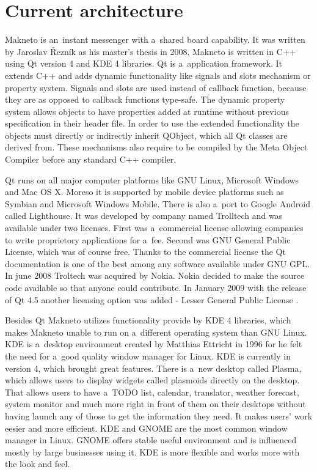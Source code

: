 \section{Current architecture}
Makneto is an~instant messenger with a~shared board capability. It was written by Jaroslav Řezník as his master's thesis in 2008. Makneto is written in C++ using Qt version 4 and KDE 4 libraries. Qt is a~application framework. It extends C++ and adds dynamic functionality like signals and slots mechanism or property system. Signals and slots are used instead of callback function, because they are as opposed to callback functions type-safe. The dynamic property system allows objects to have properties added at runtime without previous specification in their header file. In order to use the extended functionality the objects must directly or indirectly inherit QObject, which all Qt classes are derived from. These mechanisms also require to be compiled by the Meta Object Compiler before any standard C++ compiler.

Qt runs on all major computer platforms like GNU Linux, Microsoft Windows and Mac OS X. Moreso it is supported by mobile device platforms such as Symbian and Microsoft Windows Mobile. There is also a~port to Google Android called Lighthouse. It was developed by company named Trolltech and was available under two licenses. First was a~commercial license allowing companies to write proprietory applications for a~fee. Second was GNU General Public License, which was of course free. Thanks to the commercial license the Qt documentation is one of the best among any software available under GNU GPL. In june 2008 Troltech was acquired by Nokia. Nokia decided to make the source code available so that anyone could contribute. In January 2009 with the release of Qt 4.5 another licensing option was added - Lesser General Public License \cite{qtBook,Qt}.

Besides Qt Makneto utilizes functionality provide by KDE 4 \cite{KDE} libraries, which makes Makneto unable to run on a~different operating system than GNU Linux. KDE is a~desktop environment created by Matthias Ettricht in 1996 for he felt the need for a~good quality window manager for Linux. KDE is currently in version 4, which brought great features. There is a~new desktop called Plasma, which allows users to display widgets called plasmoids directly on the desktop. That allows users to have a~TODO list, calendar, translator, weather forecast, system monitor and much more right in front of them on their desktops without having launch any of those to get the information they need. It makes users' work eesier and more efficient. KDE and GNOME are the most common window manager in Linux. GNOME offers stable useful environment and is influenced mostly by large businesses using it. KDE is more flexible and works more with the look and feel.

